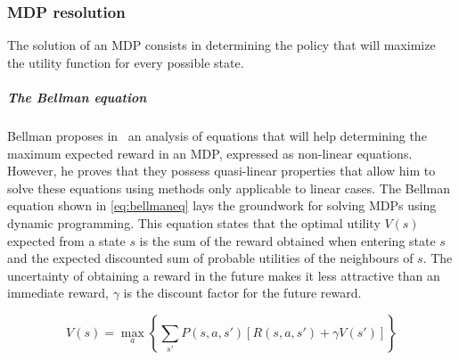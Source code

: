 \subsubsection{MDP resolution}
The solution of an MDP consists in determining the policy that will maximize the utility function for every possible state. 

\subparagraph{The Bellman equation}
Bellman proposes in~\cite{bellman1957} an analysis of equations that will help determining the maximum expected reward in an MDP, expressed as non-linear equations. However, he proves that they possess quasi-linear properties that allow him to solve these equations using methods only applicable to linear cases. 
The Bellman equation shown in \eqref{eq:bellmaneq} lays the groundwork for solving MDPs using dynamic programming.
This equation states that the optimal utility $V(s)$ expected from a state $s$ is the sum of the reward obtained when entering state $s$ and the expected discounted sum of probable utilities of the neighbours of $s$. The uncertainty of obtaining a reward in the future makes it less attractive than an immediate reward, $\gamma$ is the discount factor for the future reward.

\begin{equation}
V(s) = \max\limits_a \left \{\sum\limits_{s'}P(s,a,s')[R(s,a,s') + \gamma    V(s')  ] \right \}
\label{eq:bellmaneq}
\end{equation}






